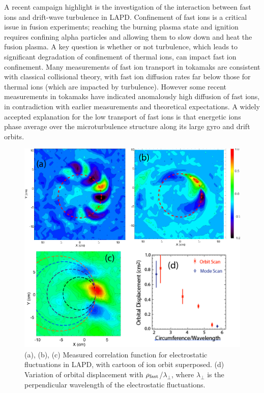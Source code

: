 \documentclass[11pt]{article}
\begin{document}
A recent campaign highlight is the investigation of the interaction
between fast ions and drift-wave turbulence in LAPD.  Confinement of
fast ions is a critical issue in fusion experiments; reaching the
burning plasma state and ignition requires confining alpha particles
and allowing them to slow down and heat the fusion plasma. A key
question is whether or not turbulence, which leads to significant
degradation of confinement of thermal ions, can impact fast ion confinement.
Many measurements of fast ion transport in
tokamaks are consistent with classical collisional theory, with fast
ion diffusion rates far below those for thermal ions (which are
impacted by turbulence).  However some recent measurements in tokamaks
have indicated anomalously high diffusion of fast ions, in
contradiction with earlier measurements and theoretical expectations.
A widely accepted explanation for the low transport of fast ions is that
energetic ions phase average over the microturbulence structure
along its large gyro and drift orbits.

\begin{figure}[!htbp]
\centerline{
\includegraphics[width=3.5truein]{fastion}}
\caption{(a), (b), (c) Measured correlation function for electrostatic
  fluctuations in LAPD, with cartoon of ion orbit superposed. (d)
  Variation of orbital displacement with $\rho_{\rm
    fast}$/$\lambda_{\perp}$, where $\lambda_\perp$ is the
  perpendicular wavelength of the electrostatic fluctuations. }\label{fastion}
\end{figure}
\end{document}
